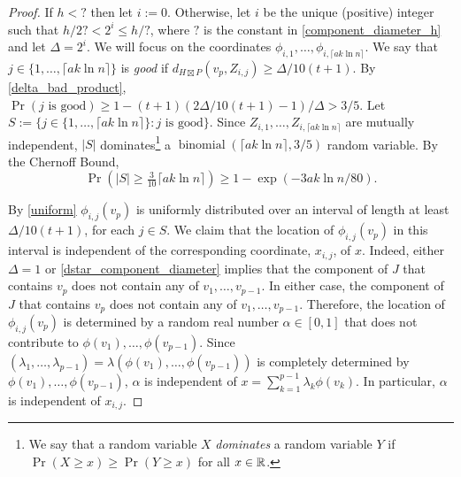 \documentclass{patmorin}
\renewcommand{\ge}{\geqslant}
\renewcommand{\le}{\leqslant}
\newcommand{\defin}[1]{\emph{\textcolor{brightmaroon}{#1}}}
\begin{document}
\begin{proof}
  If $h <?$ then let $i:=0$.  Otherwise, let $i$ be the unique (positive) integer such that $h/2?< 2^i \le h/?$, where $?$ is the constant in \cref{component_diameter_h} and let $\Delta=2^i$.  We will focus on the coordinates $\phi_{i,1},\ldots,\phi_{i,\lceil a k\ln n\rceil}$.  We say that $j\in\{1,\ldots,\lceil a k\ln n\rceil\}$ is \defin{good} if $d_{H\boxtimes P}(v_p,Z_{i,j})\ge \Delta/10(t+1)$.  By \cref{delta_bad_product},  $\Pr(\text{$j$ is good})\ge 1-(t+1)(2\Delta/10(t+1)-1)/\Delta > 3/5$. Let $S:=\{j\in\{1,\ldots,\lceil a k\ln n\rceil\}:\text{$j$ is good}\}$.  Since $Z_{i,1},\ldots,Z_{i,\lceil a k\ln n\rceil}$ are mutually independent, $|S|$ dominates\footnote{We say that a random variable $X$ \defin{dominates} a random variable $Y$ if $\Pr(X\ge x)\ge\Pr(Y\ge x)$ for all $x\in\mathbb{R}$.} a $\operatorname{binomial}(\lceil a k\ln n\rceil,3/5)$ random variable. By the Chernoff Bound,
  $$\Pr(|S|\ge \tfrac{3}{10}\lceil a k\ln n\rceil)\ge 1-\exp(-3ak\ln n/80).$$

  By \cref{uniform} $\phi_{i,j}(v_p)$ is uniformly distributed over an interval of length at least $\Delta/10(t+1)$, for each $j\in S$.  We claim that the location of $\phi_{i,j}(v_p)$ in this interval is independent of the corresponding coordinate, $x_{i,j}$, of $x$.  Indeed, either $\Delta=1$ or \cref{dstar_component_diameter} implies that the component of $J$ that contains $v_p$ does not contain any of $v_1,\ldots,v_{p-1}$. In either case, the component of $J$ that contains $v_p$ does not contain any of $v_1,\ldots,v_{p-1}$.  Therefore, the location of $\phi_{i,j}(v_p)$ is determined by a random real number $\alpha\in[0,1]$ that does not contribute to $\phi(v_1),\ldots,\phi(v_{p-1})$.  Since $(\lambda_1,\ldots,\lambda_{p-1})=\lambda(\phi(v_1),\ldots,\phi(v_{p-1}))$ is completely determined by $\phi(v_1),\ldots,\phi(v_{p-1})$, $\alpha$ is independent of $x=\sum_{k=1}^{p-1}\lambda_k\phi(v_k)$.  In particular, $\alpha$ is independent of $x_{i,j}$.


\end{proof}
\end{document}
